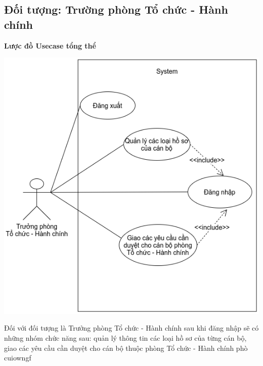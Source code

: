 \subsection{Đối tượng: Trường phòng Tổ chức - Hành chính}
\textbf{Lược đồ Usecase tổng thể}
\begin{center}
  \captionsetup{type=figure}
  \includegraphics[scale=0.7]{img/UML/Manager/truongphong.png}
\end{center}
Đối với đối tượng là Trưởng phòng Tổ chức - Hành chính sau khi đăng nhập sẽ có những nhóm chức năng sau: quản lý thông tin các loại hồ sơ của từng cán bộ, giao các yêu cầu cần duyệt cho cán bộ thuộc phòng Tổ chức - Hành chính phò cuiowngf